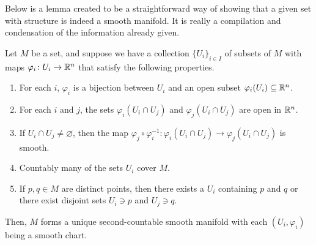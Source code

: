 \documentclass[a4paper,12pt]{article}
\begin{document}
Below is a lemma created to be a straightforward way of showing that a given set with structure is indeed a smooth manifold.
It is really a compilation and condensation of the information already given.
\begin{lemma}\label{lem:smooth_manifold_chart_lemma}
    Let $M$ be a set, and suppose we have a collection $\{U_i\}_{i \in I}$ of subsets of $M$ with maps $\varphi_i \colon U_i \to \mathbb{R}^n$ that satisfy the following properties.
    \begin{enumerate}
        \item For each $i$, $\varphi_i$ is a bijection between $U_i$ and an open subset $\varphi_i(U_i) \subseteq \mathbb{R}^n$.
        \item For each $i$ and $j$, the sets $\varphi_i(U_i \cap U_j)$ and $\varphi_j(U_i \cap U_j)$ are open in $\mathbb{R}^n$.
        \item If $U_i \cap U_j \neq \varnothing$, then the map $\varphi_j \circ \varphi^{-1}_i \colon \varphi_i(U_i \cap U_j) \to \varphi_j(U_i \cap U_j)$ is smooth.
        \item Countably many of the sets $U_i$ cover $M$.
        \item If $p, q \in M$ are distinct points, then there exists a $U_i$ containing $p$ and $q$ or there exist disjoint sets $U_i \ni p$ and $U_j \ni q$.
    \end{enumerate}
    Then, $M$ forms a unique second-countable smooth manifold with each $(U_i, \varphi_i)$ being a smooth chart.
\end{lemma}
\end{document}
